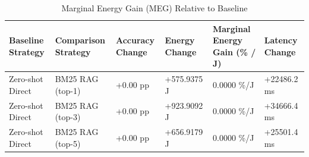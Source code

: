 \begin{table}
\caption{Marginal Energy Gain (MEG) Relative to Baseline}
\label{tab:marginal_energy_gain}
\begin{tabular}{llllll}
\toprule
Baseline Strategy & Comparison Strategy & Accuracy Change & Energy Change & Marginal Energy Gain (\% / J) & Latency Change \\
\midrule
Zero-shot Direct & BM25 RAG (top-1) & +0.00 pp & +575.9375 J & 0.0000 \%/J & +22486.2 ms \\
Zero-shot Direct & BM25 RAG (top-3) & +0.00 pp & +923.9092 J & 0.0000 \%/J & +34666.4 ms \\
Zero-shot Direct & BM25 RAG (top-5) & +0.00 pp & +656.9179 J & 0.0000 \%/J & +25501.4 ms \\
\bottomrule
\end{tabular}
\end{table}
